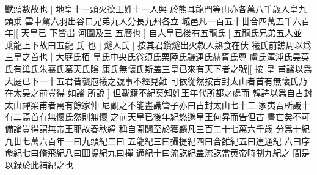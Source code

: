 獸頭數故也%
]%
地皇十一頭火德王姓十一人興%
於熊耳龍門等山亦各萬八千歳人皇九頭乗%
雲車駕六羽岀谷口兄弟九人分長九州各立%
城邑凡一百五十丗合四萬五千六百年|[%
天皇已%
下皆岀%
%
河圖及三%
五曆也%
]%
自人皇已後有五龍氏|[%
五龍氏兄弟五人並%
乗龍上下故曰五龍%
%
氏%
也%
]%
燧人氏|[%
按其君鑽燧岀火教人熟食在伏%
犧氏前譙周以爲三皇之首也%
]%
大庭氏栢%
皇氏中央氏卷須氏栗陸氏驪連氏赫胥氏尊%
盧氏渾沌氏昊英氏有巢氏朱襄氏葛天氏隂%
康氏無懷氏斯盖三皇已來有天下者之號|[%
按%
皇%
%
甫謐以爲大庭已下一十五君皆襲庖犧之號事不經見難%
可依從然按古封太山者首有無懷氏乃在太昊之前豈得%
%
如謐%
所說%
]%
但載籍不紀莫知姓王年代所都之處而%
韓詩以爲自古封太山禪梁甫者萬有餘家仲%
尼觀之不能盡識管子亦曰古封太山七十二%
家夷吾所識十有二焉首有無懷氏然則無懷%
之前天皇已後年紀悠邈皇王何昇而告但古%
書亡矣不可備論豈得謂無帝王耶故春秋緯%
稱自開闢至於獲麟凡三百二十七萬六千歳%
分爲十紀凢丗七萬六百年一曰九頭紀二曰%
五龍紀三曰攝提紀四曰合雒紀五曰連通紀%
六曰序命紀七曰脩飛紀八曰囬提紀九曰樿%
通紀十曰流訖紀盖流訖當黄帝時制九紀之%
間是以録於此補紀之也
